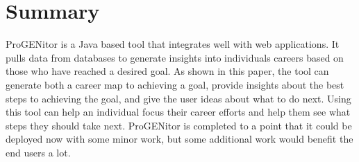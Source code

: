 \section{Summary}
\label{sect:summary}
ProGENitor is a Java based tool that integrates well with web applications.  It
pulls data from databases to generate insights into individuals careers based on
those who have reached a desired goal.  As shown in this paper, the tool can
generate both a career map to achieving a goal, provide insights about the best
steps to achieving the goal, and give the user ideas about what to do next. 
Using this tool can help an individual focus their career efforts and help them
see what steps they should take next.  ProGENitor is completed to a point that
it could be deployed now with some minor work, but some additional work would
benefit the end users a lot.
